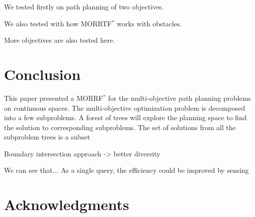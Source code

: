 \documentclass[conference]{IEEEtran}
\begin{document}
We tested firstly on path planning of two objectives.


We also tested with how MORRTF$^{*}$ works with obstacles.

 
More objectives are also tested here.

\section{Conclusion} 
\label{sec:conclusion}

This paper presented a MORRF$^{*}$ for the multi-objective path planning problems on continuous spaces.
The multi-objective optimization problem is decomposed into a few subproblems.
A forest of trees will explore the planning space to find the solution to corresponding subproblems.
The set of solutions from all the subproblem trees is a subset 

Boundary intersection approach -> better diversity

We can see that...
As a single query, the efficiency could be improved by sensing 

\section*{Acknowledgments}




\end{document}
